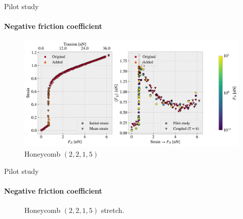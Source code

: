 \documentclass[
	10pt, %
]{beamer}
\begin{document}
\begin{frame}{Pilot study}
	\framesubtitle{Negative friction coefficient}

	\begin{figure}[H]
		\centering
		\includegraphics[width=\linewidth]{../thesis/figures/negative_coefficient/manual_coupling_tension_hon2215.pdf}	
	\caption{Honeycomb $(2,2,1,5)$}
	\end{figure}	
\end{frame}
%
%
\begin{frame}{Pilot study}
	\framesubtitle{Negative friction coefficient}
	\begin{figure}
		\centering    
		\caption{Honeycomb $(2,2,1,5)$ stretch.}
	\end{figure} 
\end{frame}
%
%
\end{document}
